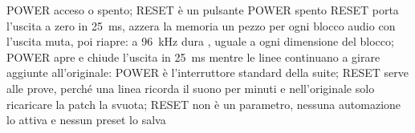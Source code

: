 {POWER acceso o spento; RESET è un pulsante}
{POWER spento}
{RESET porta l'uscita a zero in 25~ms, azzera la memoria un pezzo per ogni blocco audio con l'uscita muta, poi riapre: a \qty{96}{\kilo\hertz} dura , uguale a ogni dimensione del blocco; POWER apre e chiude l'uscita in 25~ms mentre le linee continuano a girare}
{aggiunte all'originale: POWER è l'interruttore standard della suite; RESET serve alle prove, perché una linea ricorda il suono per minuti e nell'originale solo ricaricare la patch la svuota; RESET non è un parametro, nessuna automazione lo attiva e nessun preset lo salva}
{\deciso}
{}
